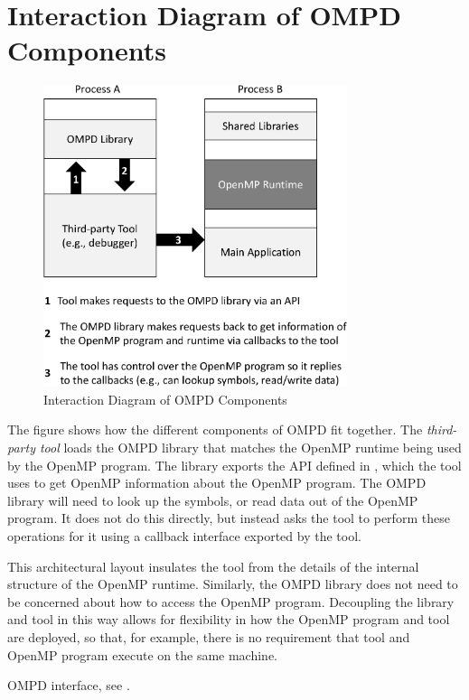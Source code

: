 \chapter{Interaction Diagram of OMPD Components}
\label{chap:ompd_diagram}


   \begin{figure}[h]
    \centering
        \includegraphics[width=3.5in]{appendices/ompd_diagram.pdf}
    \caption{Interaction Diagram of OMPD Components}
    \label{fig:ompd_diagram}
\end{figure}

The figure shows how the different components of OMPD fit together. The \emph{third-party tool} loads
the OMPD library
that matches the OpenMP runtime being used by the OpenMP program. The
library exports the API defined in
, which the tool uses to get
OpenMP information about the
OpenMP program. The OMPD
library will need to look up the symbols, or read data out of the
OpenMP program. It does not do this directly,
but instead asks the tool to perform these operations
for it using a callback interface exported
by the tool.

This architectural layout insulates the tool from the details of the
internal structure of the
OpenMP runtime. Similarly, the OMPD library does not need to be
concerned about how to access
the OpenMP program. Decoupling the library and tool in this
way allows for flexibility in how the OpenMP program and tool are deployed, so that, for example,
there is no requirement that tool and OpenMP program
execute on the same machine.

\begin{crossrefs}
\item OMPD interface, see .
\end{crossrefs}

